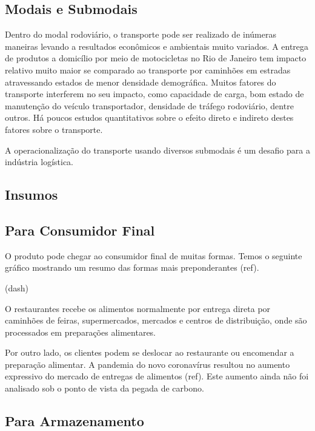 \documentclass[]{article}
\begin{document}
	\subsection{Modais e Submodais}

		Dentro do modal rodoviário, o transporte pode ser realizado de inúmeras maneiras levando a resultados econômicos e ambientais muito variados. A entrega de produtos a domicílio por meio de motocicletas no Rio de Janeiro tem impacto relativo muito maior se comparado ao transporte por caminhões em estradas atravessando estados de menor densidade demográfica. Muitos fatores do transporte interferem no seu impacto, como capacidade de carga, bom estado de manutenção do veículo transportador, densidade de tráfego rodoviário, dentre outros. Há poucos estudos quantitativos sobre o efeito direto e indireto destes fatores sobre o transporte.
		
		A operacionalização do transporte usando diversos submodais é um desafio para a indústria logística.   


	\subsection{Insumos}
	
	\subsection{Para Consumidor Final}
	
	O produto pode chegar ao consumidor final de muitas formas. Temos o seguinte gráfico mostrando um resumo das formas mais preponderantes (ref).
	
	(dash)
	
	O restaurantes recebe os alimentos normalmente por entrega direta por caminhões de feiras, supermercados, mercados e centros de distribuição, onde são processados em preparações alimentares.
	
	Por outro lado, os clientes podem se deslocar ao restaurante ou encomendar a preparação alimentar. A pandemia do novo coronavírus resultou no aumento expressivo do mercado de entregas de alimentos (ref). Este aumento ainda não foi analisado sob o ponto de vista da pegada de carbono. 
	
	
	
	\subsection{Para Armazenamento}
	
\end{document}
